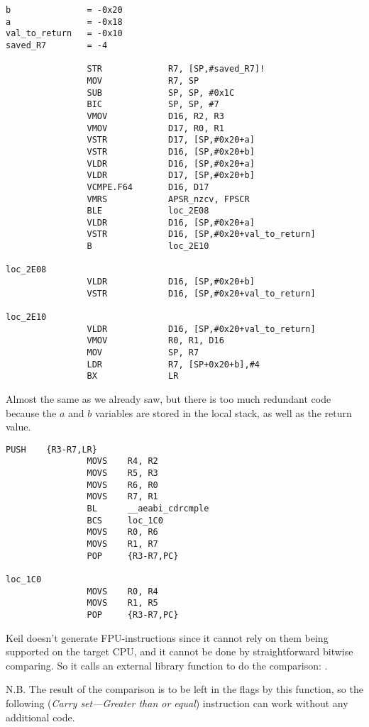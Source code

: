 \begin{lstlisting}[caption=\NonOptimizingXcodeIV (\ARMMode),style=customasmARM]
b               = -0x20
a               = -0x18
val_to_return   = -0x10
saved_R7        = -4

                STR             R7, [SP,#saved_R7]!
                MOV             R7, SP
                SUB             SP, SP, #0x1C
                BIC             SP, SP, #7
                VMOV            D16, R2, R3
                VMOV            D17, R0, R1
                VSTR            D17, [SP,#0x20+a]
                VSTR            D16, [SP,#0x20+b]
                VLDR            D16, [SP,#0x20+a]
                VLDR            D17, [SP,#0x20+b]
                VCMPE.F64       D16, D17
                VMRS            APSR_nzcv, FPSCR
                BLE             loc_2E08
                VLDR            D16, [SP,#0x20+a]
                VSTR            D16, [SP,#0x20+val_to_return]
                B               loc_2E10

loc_2E08
                VLDR            D16, [SP,#0x20+b]
                VSTR            D16, [SP,#0x20+val_to_return]

loc_2E10
                VLDR            D16, [SP,#0x20+val_to_return]
                VMOV            R0, R1, D16
                MOV             SP, R7
                LDR             R7, [SP+0x20+b],#4
                BX              LR
\end{lstlisting}

Almost the same as we already saw, 
but there is too much redundant code because the $a$ and $b$ variables are stored in the local stack, as well
as the return value.

\myparagraph{\OptimizingKeilVI (\ThumbMode)}

\begin{lstlisting}[caption=\OptimizingKeilVI (\ThumbMode),style=customasmARM]
                PUSH    {R3-R7,LR}
                MOVS    R4, R2
                MOVS    R5, R3
                MOVS    R6, R0
                MOVS    R7, R1
                BL      __aeabi_cdrcmple
                BCS     loc_1C0
                MOVS    R0, R6
                MOVS    R1, R7
                POP     {R3-R7,PC}

loc_1C0
                MOVS    R0, R4
                MOVS    R1, R5
                POP     {R3-R7,PC}
\end{lstlisting}


Keil doesn't generate FPU-instructions since it cannot rely on them being
supported on the target CPU, and it cannot be done by straightforward bitwise comparing.
So it calls an external library function to do the comparison: . 

N.B. The result of the comparison is to be left in the flags by this function, so the following
 (\emph{Carry set---Greater than or equal})
instruction can work without any additional code.

